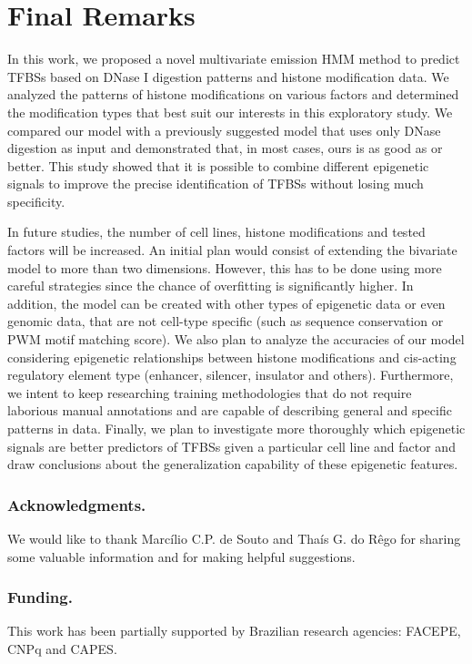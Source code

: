 \documentclass[runningheads,a4paper]{llncs}
\begin{document}
\section{Final Remarks}

In this work, we proposed a novel multivariate emission HMM method to
predict TFBSs based on DNase I digestion patterns and histone
modification data. We analyzed the patterns of histone modifications
on various factors and determined the modification types that best
suit our interests in this exploratory study. We compared our model
with a previously suggested model that uses only DNase digestion as
input and demonstrated that, in most cases, ours is as good as or
better. This study showed that it is possible to combine different
epigenetic signals to improve the precise identification of TFBSs
without losing much specificity.

In future studies, the number of cell lines, histone modifications and
tested factors will be increased. An initial plan would consist of extending
the bivariate model to more than two dimensions. However, this has to
be done using more careful strategies since the chance of overfitting
is significantly higher. In addition, the model can be created with
other types of epigenetic data or even genomic data, that are not
cell-type specific (such as sequence conservation or PWM motif
matching score). We also plan to analyze the accuracies of our model
considering epigenetic relationships between histone modifications and
cis-acting regulatory element type (enhancer, silencer, insulator and
others). Furthermore, we intent to keep researching training methodologies
that do not require laborious manual annotations and are capable of
describing general and specific patterns in data. Finally, we plan to
investigate more thoroughly which epigenetic signals are better predictors of TFBSs
given a particular cell line and factor and draw conclusions about the generalization
capability of these epigenetic features.

\subsubsection*{Acknowledgments.} We would like to thank Marc\'{i}lio
C.P. de Souto and Tha\'{i}s G. do R\^{e}go for sharing some valuable
information and for making helpful suggestions.

\subsubsection*{Funding.}  This work has been partially supported by Brazilian research agencies: FACEPE, CNPq and CAPES.
\end{document}
